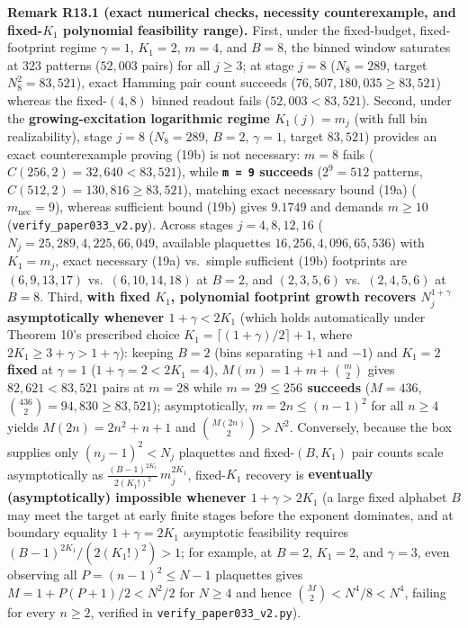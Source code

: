 \documentclass[
  american,
  11pt,
  letterpaper,
]{article}
\begin{document}
\textbf{Remark R13.1 (exact numerical checks, necessity counterexample, and fixed-\(K_1\) polynomial feasibility range).} First, under the fixed-budget, fixed-footprint regime \(\gamma = 1\), \(K_1 = 2\), \(m = 4\), and \(B = 8\), the binned window saturates at \(323\) patterns (\(52{,}003\) pairs) for all \(j \ge 3\); at stage \(j = 8\) (\(N_8 = 289\), target \(N_8^2 = 83{,}521\)), exact Hamming pair count succeeds (\(76{,}507{,}180{,}035 \ge 83{,}521\)) whereas the fixed-\((4, 8)\) binned readout fails (\(52{,}003 < 83{,}521\)). Second, under the \textbf{growing-excitation logarithmic regime \(K_1(j) = m_j\)} (with full bin realizability), stage \(j = 8\) (\(N_8 = 289\), \(B = 2\), \(\gamma = 1\), target \(83{,}521\)) provides an exact counterexample proving (19b) is not necessary: \(m = 8\) fails (\(C(256, 2) = 32{,}640 < 83{,}521\)), while \textbf{\texttt{m\ =\ 9} succeeds} (\(2^9 = 512\) patterns, \(C(512, 2) = 130{,}816 \ge 83{,}521\)), matching exact necessary bound (19a) (\(m_{\mathrm{nec}} = 9\)), whereas sufficient bound (19b) gives \(9.1749\) and demands \(m \ge 10\) (\nolinkurl{verify_paper033_v2.py}). Across stages \(j = 4, 8, 12, 16\) (\(N_j = 25, 289, 4{,}225, 66{,}049\), available plaquettes \(16, 256, 4{,}096, 65{,}536\)) with \(K_1 = m_j\), exact necessary (19a) vs.~simple sufficient (19b) footprints are \((6, 9, 13, 17)\) vs.~\((6, 10, 14, 18)\) at \(B = 2\), and \((2, 3, 5, 6)\) vs.~\((2, 4, 5, 6)\) at \(B = 8\). Third, \textbf{with fixed \(K_1\), polynomial footprint growth recovers \(N_j^{1+\gamma}\) asymptotically whenever \(1 + \gamma < 2 K_1\)} (which holds automatically under Theorem 10's prescribed choice \(K_1 = \lceil(1+\gamma)/2\rceil + 1\), where \(2 K_1 \ge 3 + \gamma > 1 + \gamma\)): keeping \(B = 2\) (bins separating \(+1\) and \(-1\)) and \textbf{\(K_1 = 2\) fixed} at \(\gamma = 1\) (\(1 + \gamma = 2 < 2 K_1 = 4\)), \(M(m) = 1 + m + \binom{m}{2}\) gives \(82{,}621 < 83{,}521\) pairs at \(m = 28\) while \textbf{\(m = 29 \le 256\) succeeds} (\(M = 436\), \(\binom{436}{2} = 94{,}830 \ge 83{,}521\)); asymptotically, \(m = 2n \le (n-1)^2\) for all \(n \ge 4\) yields \(M(2n) = 2n^2 + n + 1\) and \(\binom{M(2n)}{2} > N^2\). Conversely, because the box supplies only \((n_j - 1)^2 < N_j\) plaquettes and fixed-\((B, K_1)\) pair counts scale asymptotically as \(\frac{(B-1)^{2 K_1}}{2(K_1!)^2}\,m_j^{2 K_1}\), fixed-\(K_1\) recovery is \textbf{eventually (asymptotically) impossible whenever \(1 + \gamma > 2 K_1\)} (a large fixed alphabet \(B\) may meet the target at early finite stages before the exponent dominates, and at boundary equality \(1 + \gamma = 2 K_1\) asymptotic feasibility requires \((B-1)^{2 K_1}/(2(K_1!)^2) > 1\); for example, at \(B = 2\), \(K_1 = 2\), and \(\gamma = 3\), even observing all \(P = (n-1)^2 \le N - 1\) plaquettes gives \(M = 1 + P(P+1)/2 < N^2/2\) for \(N \ge 4\) and hence \(\binom{M}{2} < N^4/8 < N^4\), failing for every \(n \ge 2\), verified in \nolinkurl{verify_paper033_v2.py}).
\end{document}

